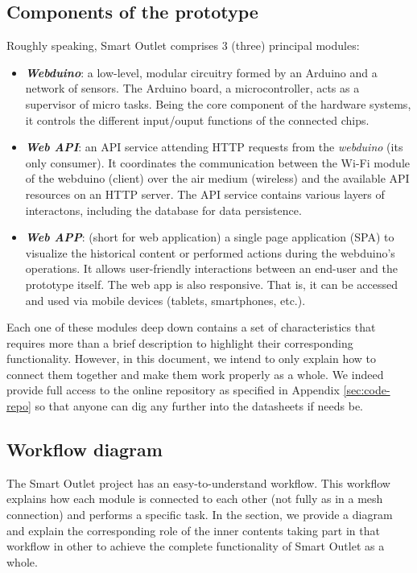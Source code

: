 \subsection{Components of the prototype}
Roughly speaking, Smart Outlet comprises 3 (three) principal modules:
\begin{itemize}
    \item \textbf{\textit{Webduino}}: a low-level, modular circuitry formed by an Arduino and a network of sensors. The Arduino board, a microcontroller, acts as a supervisor of micro tasks. Being the core component of the hardware systems, it controls the different input/ouput functions of the connected chips.
    \item \textbf{\textit{Web API}}: an API service attending HTTP requests from the \emph{webduino} (its only consumer). It coordinates the communication between the Wi-Fi module of the webduino (client) over the air medium (wireless) and the available API resources on an HTTP server. The API service contains various layers of interactons, including the database for data persistence.
    \item \textbf{\textit{Web APP}}: (short for web application) a single page application (SPA) to visualize the historical content or performed actions during the webduino's operations. It allows user-friendly interactions between an end-user and the prototype itself. The web app is also responsive. That is, it can be accessed and used via mobile devices (tablets, smartphones, etc.).
\end{itemize}

Each one of these modules deep down contains a set of characteristics that requires more than a brief description to highlight their corresponding functionality. However, in this document, we intend to only explain how to connect them together and make them work properly as a whole. We indeed provide full access to the online repository as specified in Appendix \ref{sec:code-repo} so that anyone can dig any further into the datasheets if needs be.

\subsection{Workflow diagram}
The Smart Outlet project has an easy-to-understand workflow. This workflow explains how each module is connected to each other (not fully as in a mesh connection) and performs a specific task. In the section, we provide a diagram and explain the corresponding role of the inner contents taking part in that workflow in other to achieve the complete functionality of Smart Outlet as a whole.

